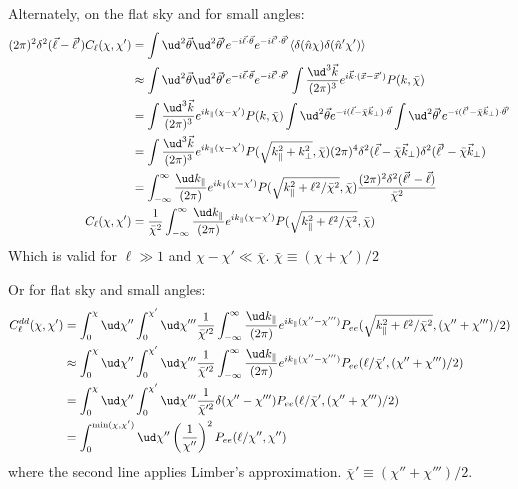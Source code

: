 \begin{widetext}
Alternately, on the flat sky and for small angles:
\begin{align}
(2\pi)^2\delta^2(\vec \ell - \vec \ell')C_\ell(\chi, \chi')
    &=
        \int\ud^2\vec\theta\ud^2\vec\theta'
        e^{-i\vec\ell\cdot\vec\theta} e^{-i\vec\ell'\cdot\vec\theta'}
        \langle \delta(\hat n \chi) \delta(\hat n' \chi') \rangle
        \\
    &\approx
        \int\ud^2\vec\theta\ud^2\vec\theta'
        e^{-i\vec\ell\cdot\vec\theta} e^{-i\vec\ell'\cdot\vec\theta'}
        \int\frac{\ud^3\vec k}{(2 \pi)^3} 
        e^{i\vec k \cdot (\vec x - \vec x')} P(k, \bar\chi)
        \\
    &=
        \int\frac{\ud^3\vec k}{(2 \pi)^3} 
        e^{i k_\parallel (\chi - \chi')} P(k, \bar\chi)
        \int\ud^2\vec\theta e^{-i(\vec\ell-\bar\chi\vec k_\bot)\cdot\vec\theta}
        \int\ud^2\vec\theta' e^{-i(\vec\ell'-\bar\chi\vec k_\bot)\cdot\vec\theta'}
        \\
    &=
        \int\frac{\ud^3\vec k}{(2 \pi)^3} 
        e^{i k_\parallel (\chi - \chi')} P(\sqrt{k_\parallel^2 + k_\bot^2}, \bar\chi)
        (2\pi)^4 \delta^2(\vec\ell - \bar\chi \vec k_\bot)
        \delta^2(\vec\ell' - \bar\chi\vec k_\bot)
        \\
    &=
        \int_{-\infty}^\infty\frac{\ud k_\parallel}{(2 \pi)} 
        e^{i k_\parallel (\chi - \chi')}
        P(\sqrt{k_\parallel^2 + \ell^2/\bar\chi^2}, \bar\chi)
        \frac{(2\pi)^2\delta^2(\vec\ell' - \vec \ell)}{\bar\chi^2}
        \\
C_\ell(\chi, \chi')
    &= \frac{1}{\bar\chi^2}
        \int_{-\infty}^\infty\frac{\ud k_\parallel}{(2 \pi)} 
        e^{i k_\parallel (\chi - \chi')}
        P(\sqrt{k_\parallel^2 + \ell^2/\bar\chi^2}, \bar\chi)
\end{align}
Which is valid for $\ell \gg 1$ and $\chi - \chi' \ll \bar\chi$.
$\bar \chi \equiv (\chi + \chi') /2$


Or for flat sky and small angles:
\begin{align}
C^{dd}_\ell(\chi,\chi') 
    &=
    \int_0^\chi\ud\chi''
    \int_0^{\chi'}\ud\chi'''
    \frac{1}{\bar\chi^{\prime 2}}
    \int_{-\infty}^\infty\frac{\ud k_\parallel}{(2 \pi)} 
    e^{i k_\parallel (\chi'' - \chi''')}
    P_{ee}(\sqrt{k_\parallel^2 + \ell^2/\bar\chi^2}, (\chi'' + \chi''')/2)
    \\
    &\approx
    \int_0^\chi\ud\chi''
    \int_0^{\chi'}\ud\chi'''
    \frac{1}{\bar\chi^{\prime 2}}
    \int_{-\infty}^\infty\frac{\ud k_\parallel}{(2 \pi)} 
    e^{i k_\parallel (\chi'' - \chi''')}
    P_{ee}(\ell/\bar\chi', (\chi'' + \chi''')/2)
    \\
    &=
    \int_0^\chi\ud\chi''
    \int_0^{\chi'}\ud\chi'''
    \frac{1}{\bar\chi^{\prime 2}}
    \delta(\chi'' - \chi''')
    P_{ee}(\ell/\bar\chi', (\chi'' + \chi''')/2)
    \\
    &=
    \int_0^{\min(\chi,\chi')}\ud\chi''
    \left(\frac{1}{\chi''}\right)^2
    P_{ee}(\ell/\chi'', \chi'')
\end{align}
where the second line applies Limber's approximation. 
$\bar\chi' \equiv (\chi'' + \chi''')/2$.


\end{widetext}
